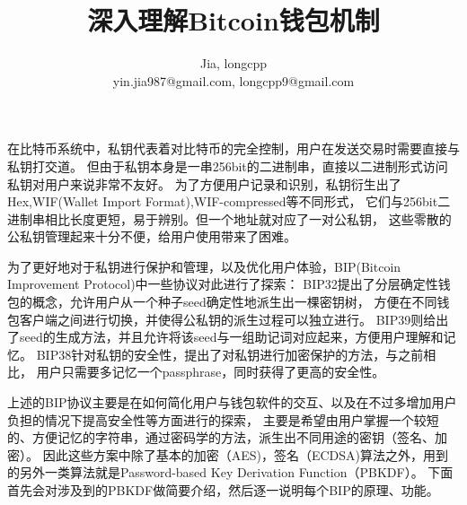 \documentclass{article}
\begin{document}
\title{深入理解Bitcoin钱包机制}
\author{Jia, longcpp \\ \small{yin.jia987@gmail.com, longcpp9@gmail.com}}

\maketitle


在比特币系统中，私钥代表着对比特币的完全控制，用户在发送交易时需要直接与私钥打交道。
但由于私钥本身是一串256bit的二进制串，直接以二进制形式访问私钥对用户来说非常不友好。
为了方便用户记录和识别，私钥衍生出了Hex,WIF(Wallet Import Format),WIF-compressed等不同形式，
它们与256bit二进制串相比长度更短，易于辨别。但一个地址就对应了一对公私钥，
这些零散的公私钥管理起来十分不便，给用户使用带来了困难。

为了更好地对于私钥进行保护和管理，以及优化用户体验，BIP(Bitcoin Improvement Protocol)中一些协议对此进行了探索：
BIP32提出了分层确定性钱包的概念，允许用户从一个种子seed确定性地派生出一棵密钥树，
方便在不同钱包客户端之间进行切换，并使得公私钥的派生过程可以独立进行。
BIP39则给出了seed的生成方法，并且允许将该seed与一组助记词对应起来，方便用户理解和记忆。
BIP38针对私钥的安全性，提出了对私钥进行加密保护的方法，与之前相比，
用户只需要多记忆一个passphrase，同时获得了更高的安全性。

上述的BIP协议主要是在如何简化用户与钱包软件的交互、以及在不过多增加用户负担的情况下提高安全性等方面进行的探索，
主要是希望由用户掌握一个较短的、方便记忆的字符串，通过密码学的方法，派生出不同用途的密钥（签名、加密）。
因此这些方案中除了基本的加密（AES)，签名（ECDSA)算法之外，用到的另外一类算法就是Password-based Key Derivation Function（PBKDF）。
下面首先会对涉及到的PBKDF做简要介绍，然后逐一说明每个BIP的原理、功能。








\end{document}
